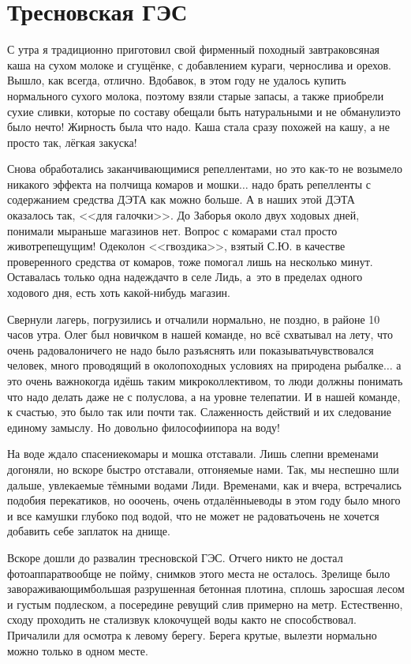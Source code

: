 \chapter{Тресновская ГЭС} 
\vepsianrose

С утра я традиционно приготовил свой фирменный походный завтрак\mdash овсяная каша на сухом молоке и сгущёнке, с добавлением кураги, чернослива и орехов. Вышло, как всегда, отлично. Вдобавок, в этом году не удалось купить нормального сухого молока, поэтому взяли старые запасы, а также приобрели сухие сливки, которые по составу обещали быть натуральными и не обманули\mdash это было нечто! Жирность была что надо. Каша стала сразу похожей на кашу, а не просто так, лёгкая закуска! 

Снова обработались заканчивающимися репеллентами, но это как-то не возымело никакого эффекта на полчища комаров и мошки$\ldots$ надо брать репелленты с содержанием средства ДЭТА как можно больше. А в наших этой ДЭТА оказалось так, <<для галочки>>. До Заборья около двух ходовых дней, понимали мы\mdash раньше магазинов нет. Вопрос с комарами стал просто животрепещущим! Одеколон <<гвоздика>>, взятый С.Ю. в качестве проверенного средства от комаров, тоже помогал лишь на несколько минут. Оставалась только одна надежда\mdash что в селе Лидь, а~это в пределах одного ходового дня, есть хоть какой-нибудь магазин.

Свернули лагерь, погрузились и отчалили нормально, не поздно, в районе 10 часов утра. Олег был новичком в нашей команде, но всё схватывал на лету, что очень радовало\mdash ничего не надо было разъяснять или показывать\mdash чувствовался человек, много проводящий в околопоходных условиях на природе\mdash на рыбалке$\ldots$ а это очень важно\mdash когда идёшь таким микроколлективом, то люди должны понимать что надо делать даже не с полуслова, а на уровне телепатии. И в нашей команде, к счастью, это было так или почти так. Слаженность действий и их следование единому замыслу. Но довольно философии\mdash пора на воду!

На воде ждало спасение\mdash комары и мошка отставали. Лишь слепни временами догоняли, но вскоре быстро отставали, отгоняемые нами. Так, мы неспешно шли дальше, увлекаемые тёмными водами Лиди. Временами, как и вчера, встречались подобия перекатиков, но о\sdash о\sdash очень, очень отдалённые\mdash воды в этом году было много и все камушки глубоко под водой, что не может не радовать\mdash очень не хочется добавить себе заплаток на днище. 

Вскоре дошли до развалин тресновской ГЭС. Отчего никто не достал фотоаппарат\mdash вообще не пойму, снимков этого места не осталось. Зрелище было завораживающим\mdash большая разрушенная бетонная плотина, сплошь заросшая лесом и густым подлеском, а посередине ревущий слив примерно на метр. Естественно, сходу проходить не стали\mdash звук клокочущей воды как\sdash то не способствовал. Причалили для осмотра к левому берегу. Берега крутые, вылезти нормально можно только в одном месте. 

